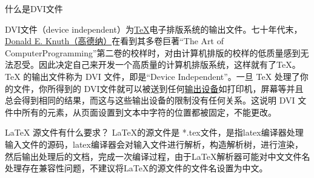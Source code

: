 \begin{faq}{什么是DVI文件}

  DVI文件（device independent）为\href{https://baike.baidu.com/item/TeX}{TeX}电子排版系统的输出文件。七十年代末，\href{https://baike.baidu.com/item/Donald%20E.%20Knuth}{Donald E. Knuth（高德纳）}在看到其多卷巨著“The Art of ComputerProgramming”第二卷的校样时，对由计算机排版的校样的低质量感到无法忍受。因此决定自己来开发一个高质量的计算机排版系统，这样就有了TeX。TeX 的输出文件称为 DVI 文件，即是“Device Independent”。一旦 TeX 处理了你的文件，你所得到的 DVI文件就可以被送到任何\href{https://baike.baidu.com/item/%E8%BE%93%E5%87%BA%E8%AE%BE%E5%A4%87}{输出设备}如打印机，屏幕等并且总会得到相同的结果，而这与这些输出设备的限制没有任何关系。这说明 DVI 文件中所有的元素，从页面设置到文本中字符的位置都被固定，不能更改。

\end{faq}

%

\begin{faq}{\LaTeX{} 源文件有什么要求？}
  LaTeX的源文件是 *.tex文件，是指latex编译器处理输入文件的源码，latex编译器会对输入文件进行解析，构造解析树，进行渲染，然后输出处理后的文档，完成一次编译过程，由于LaTeX解析器可能对中文文件名处理存在兼容性问题，不建议将LaTeX的源文件的文件名设置为中文。
\end{faq}
